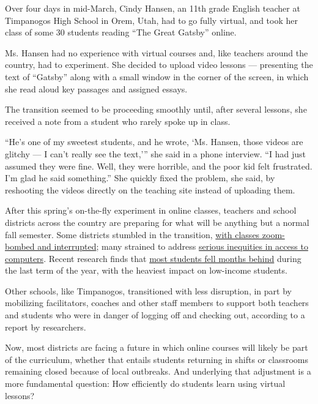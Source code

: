 Over four days in mid-March, Cindy Hansen, an 11th grade English teacher
at Timpanogos High School in Orem, Utah, had to go fully virtual, and
took her class of some 30 students reading ``The Great Gatsby'' online.

Ms. Hansen had no experience with virtual courses and, like teachers
around the country, had to experiment. She decided to upload video
lessons --- presenting the text of ``Gatsby'' along with a small window
in the corner of the screen, in which she read aloud key passages and
assigned essays.

The transition seemed to be proceeding smoothly until, after several
lessons, she received a note from a student who rarely spoke up in
class.

``He's one of my sweetest students, and he wrote, `Ms. Hansen, those
videos are glitchy --- I can't really see the text,''' she said in a
phone interview. ``I had just assumed they were fine. Well, they were
horrible, and the poor kid felt frustrated. I'm glad he said
something.'' She quickly fixed the problem, she said, by reshooting the
videos directly on the teaching site instead of uploading them.

After this spring's on-the-fly experiment in online classes, teachers
and school districts across the country are preparing for what will be
anything but a normal fall semester. Some districts stumbled in the
transition, \href{https://www.washingtonpost.com}{with classes
zoom-bombed and interrupted}; many strained to address
\href{https://www.nytimes.com/2020/04/06/us/coronavirus-schools-attendance-absent.html}{serious
inequities in access to computers}. Recent research finds that
\href{https://www.nytimes.com/2020/06/05/us/coronavirus-education-lost-learning.html}{most
students fell months behind} during the last term of the year, with the
heaviest impact on low-income students.

Other schools, like Timpanogos, transitioned with less disruption, in
part by mobilizing facilitators, coaches and other staff members to
support both teachers and students who were in danger of logging off and
checking out, according to a report by researchers.

Now, most districts are facing a future in which online courses will
likely be part of the curriculum, whether that entails students
returning in shifts or classrooms remaining closed because of local
outbreaks. And underlying that adjustment is a more fundamental
question: How efficiently do students learn using virtual lessons?

